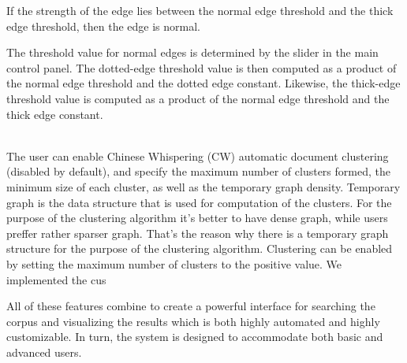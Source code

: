 \begin{description}
If the strength of the edge lies between the normal edge threshold and the thick edge threshold, then the edge is normal.

The threshold value for normal edges is determined by the slider in the main control panel. The dotted-edge threshold value is then computed as a product of the normal edge threshold and the dotted edge constant. Likewise, the thick-edge threshold value is computed as a product of the normal edge threshold and the thick edge constant.
\item[\scare{Clustering Settings}] \hfill \\
The user can enable Chinese Whispering (CW) automatic document clustering (disabled by default), and specify the maximum number of clusters formed, the minimum size of each cluster, as well as the temporary graph density. Temporary graph is the data structure that is used for computation of the clusters. For the purpose of the clustering algorithm it's better to have dense graph, while users preffer rather sparser graph. That's the reason why there is a temporary graph structure for the purpose of the clustering algorithm. 
Clustering can be enabled by setting the maximum number of clusters to the positive value.
We implemented the cus
\end{description}

All of these features combine to create a powerful interface for searching the corpus and visualizing the results which is both highly automated and highly customizable. In turn, the system is designed to accommodate both basic and advanced users.
